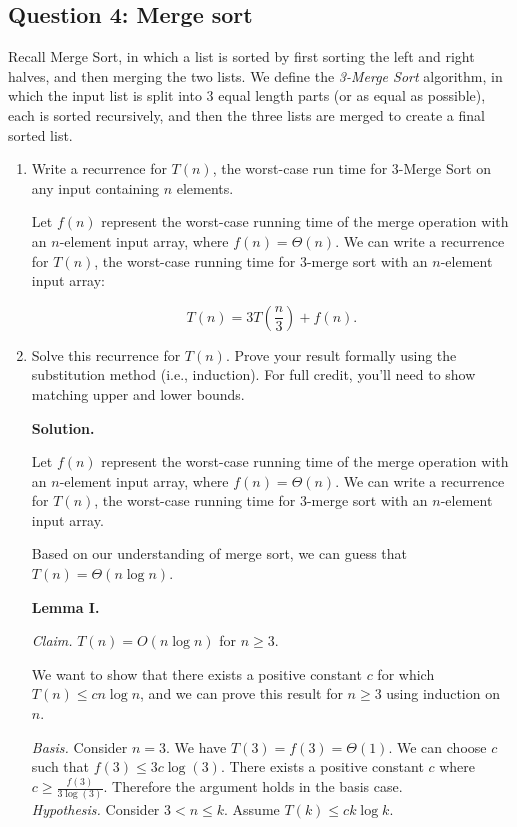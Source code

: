 \subsection*{Question 4: Merge sort}
Recall Merge Sort, in which a list is sorted by first sorting the left and right halves, and then merging the two lists. 
We define the \textit{3-Merge Sort} algorithm, in which the input list is split into $3$
equal length parts (or as equal as possible), each is sorted recursively, and then the three lists are merged to create a final sorted list. 
\begin{enumerate}
\item Write a recurrence for $T(n)$, the worst-case run time for 3-Merge Sort on any input containing $n$ elements.

Let $f(n)$ represent the worst-case running time of the merge operation with an $n$-element input array, where $f(n)=\Theta(n)$. We can write a recurrence for $T(n)$, the worst-case running time for 3-merge sort with an $n$-element input array:

\[T(n)=3T\left(\frac{n}{3}\right)+f(n).\]

\item Solve this recurrence for $T(n)$. Prove your result formally using the substitution method (i.e., induction). For full credit, you'll need to show matching upper and lower bounds.

\textbf{Solution. }

Let $f(n)$ represent the worst-case running time of the merge operation with an $n$-element input array, where $f(n)=\Theta(n)$. We can write a recurrence for $T(n)$, the worst-case running time for 3-merge sort with an $n$-element input array.

Based on our understanding of merge sort, we can guess that $T(n)=\Theta(n\log n)$.

\textbf{Lemma I. }

\textit{Claim. }$T(n)=O(n\log n)$ for $n\geq 3$.

We want to show that there exists a positive constant $c$ for which $T(n)\leq cn\log n$, and we can prove this result for $n\geq 3$ using induction on $n$.

\textit{Basis. }Consider $n=3$. We have $T(3)=f(3)=\Theta(1)$. We can choose $c$ such that $f(3)\leq 3c\log(3)$. There exists a positive constant $c$ where $c\geq\frac{f(3)}{3\log(3)}$. Therefore the argument holds in the basis case.\\

\textit{Hypothesis. }Consider $3<n\leq k$. Assume $T(k)\leq ck\log k$.\\


\end{enumerate}
